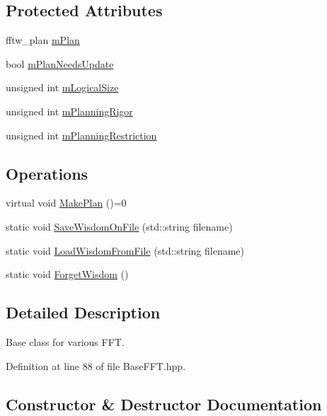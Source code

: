 \subsection*{Protected Attributes}
\begin{DoxyCompactItemize}
\item 
fftw\+\_\+plan \hyperlink{classtsa_1_1_base_f_f_t_a5c7dd6dee349547018d493be6d5874eb}{m\+Plan}
\item 
bool \hyperlink{classtsa_1_1_base_f_f_t_aa89fef1777c6df148cdb8533265b6163}{m\+Plan\+Needs\+Update}
\item 
unsigned int \hyperlink{classtsa_1_1_base_f_f_t_a171c71011fea314f23633b1816771d98}{m\+Logical\+Size}
\item 
unsigned int \hyperlink{classtsa_1_1_base_f_f_t_abbd656cda5a7cb6a88fc5d556d3269f7}{m\+Planning\+Rigor}
\item 
unsigned int \hyperlink{classtsa_1_1_base_f_f_t_a2fe7f53db024bb408beeb5e22eaefbb9}{m\+Planning\+Restriction}
\end{DoxyCompactItemize}
\subsection*{Operations}
\begin{DoxyCompactItemize}
\item 
virtual void \hyperlink{classtsa_1_1_base_f_f_t_a9af0c36413173821cac8dbdce9cfe3b4}{Make\+Plan} ()=0
\item 
static void \hyperlink{classtsa_1_1_base_f_f_t_a1f5332f508749018f0c6a58c9b1ed9dc}{Save\+Wisdom\+On\+File} (std\+::string filename)
\item 
static void \hyperlink{classtsa_1_1_base_f_f_t_a53ccc1ae425bb9f91adbd5562ecb9131}{Load\+Wisdom\+From\+File} (std\+::string filename)
\item 
static void \hyperlink{classtsa_1_1_base_f_f_t_a7069819e421ad4cb2a4c58f65c8540ea}{Forget\+Wisdom} ()
\end{DoxyCompactItemize}


\subsection{Detailed Description}
Base class for various F\+FT. 

Definition at line 88 of file Base\+F\+F\+T.\+hpp.



\subsection{Constructor \& Destructor Documentation}
\mbox{\label{classtsa_1_1_base_f_f_t_a724f59f3f5bded31174373eac81e67ee}} 
